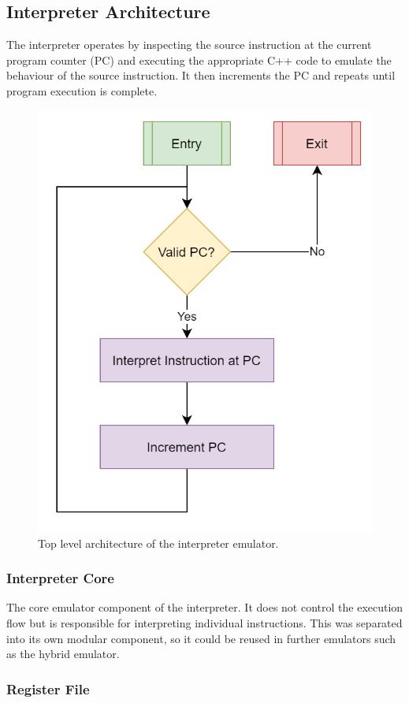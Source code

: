 \subsection{Interpreter Architecture}

The interpreter operates by inspecting the source instruction at the current program counter (PC) and executing the appropriate C++ code to emulate the behaviour of the source instruction. It then increments the PC and repeats until program execution is complete.

\begin{figure}[h]
    \centering
    \includegraphics[width=0.5\linewidth]{diagrams/interpreter.png}
    \caption{Top level architecture of the interpreter emulator.}
    \label{figure:interpreter-arch}
\end{figure}

\subsubsection{Interpreter Core}

The core emulator  component of the interpreter. It does not control the execution flow but is responsible for interpreting individual instructions. This was separated into its own modular component, so it could be reused in further emulators such as the hybrid emulator.

\subsubsection{Register File}
\label{section:interpreter-reg-file}

